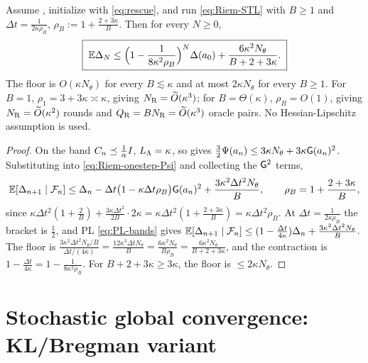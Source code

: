 \begin{theorem}
\label{thm:Riem-selfbound}
Assume , initialize with \eqref{eq:rescue}, and run \eqref{eq:Riem-STL}
with $B\geq1$ and $\Delta t=\tfrac1{2\kappa\rho_B}$, $\rho_B:=1+\tfrac{2+3\kappa}B$. Then for every
$N\geq0$,
\begin{equation}
\label{eq:Riem-selfbound}
    \boxed{\;
    \mathbb{E}\Delta_N\leq\Bigl(1-\frac1{8\kappa^2\rho_B}\Bigr)^N\Delta(a_0)+\frac{6\kappa^2N_\theta}{B+2+3\kappa} .
    \;}
\end{equation}
The floor is $O(\kappa N_\theta)$ for every $B\lesssim\kappa$ and at most $2\kappa N_\theta$ for every
$B\geq1$. For $B=1$, $\rho_1=3+3\kappa\asymp\kappa$, giving $N_{\mathrm{R}}=\widetilde O(\kappa^3)$; for
$B=\Theta(\kappa)$, $\rho_B=O(1)$, giving $N_{\mathrm{R}}=\widetilde O(\kappa^2)$ rounds and
$Q_{\mathrm{R}}=BN_{\mathrm{R}}=\widetilde O(\kappa^3)$ oracle pairs. No Hessian-Lipschitz assumption is used.
\end{theorem}

\begin{proof}
On the band $C_n\preceq\tfrac1\alpha I$, $L_\Lambda=\kappa$, so  gives
$\tfrac32\Psi(a_n)\leq3\kappa N_\theta+3\kappa\mathsf{G}(a_n)^2$. Substituting into
\eqref{eq:Riem-onestep-Psi} and collecting the $\mathsf{G}^2$ terms,
\[
    \mathbb{E}[\Delta_{n+1}\mid\mathcal{F}_n]
    \leq\Delta_n-\Delta t\bigl(1-\kappa\Delta t\rho_B\bigr)\mathsf{G}(a_n)^2+\frac{3\kappa^2\Delta t^2N_\theta}B,
    \qquad
    \rho_B=1+\frac{2+3\kappa}B,
\]
since $\kappa\Delta t^2(1+\tfrac2B)+\tfrac{3\kappa\Delta t^2}{2B}\cdot2\kappa=\kappa\Delta t^2(1+\tfrac{2+3\kappa}B)=\kappa\Delta t^2\rho_B$.
At $\Delta t=\tfrac1{2\kappa\rho_B}$ the bracket is $\tfrac12$, and PL \eqref{eq:PL-bands} gives
$\mathbb{E}[\Delta_{n+1}\mid\mathcal{F}_n]\leq(1-\tfrac{\Delta t}{4\kappa})\Delta_n+\tfrac{3\kappa^2\Delta t^2N_\theta}B$.
The floor is $\tfrac{3\kappa^2\Delta t^2N_\theta/B}{\Delta t/(4\kappa)}=\tfrac{12\kappa^3\Delta tN_\theta}B=\tfrac{6\kappa^2N_\theta}{B\rho_B}=\tfrac{6\kappa^2N_\theta}{B+2+3\kappa}$,
and the contraction is $1-\tfrac{\Delta t}{4\kappa}=1-\tfrac1{8\kappa^2\rho_B}$. For $B+2+3\kappa\geq3\kappa$,
the floor is $\leq2\kappa N_\theta$.
\end{proof}
\section{Stochastic global convergence: KL/Bregman variant}
\label{sec:stoch-KL}

